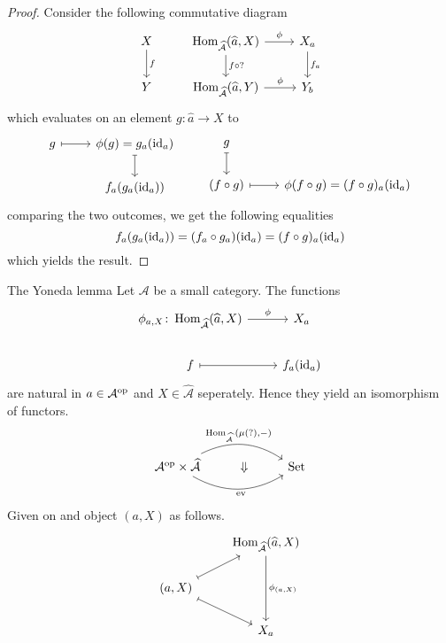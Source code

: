 \begin{proof}
    Consider the following commutative diagram 
    \[
    \begin{tikzcd}
        X
        \arrow[d,"f"]
        & 
        \Hom_{\widehat{\mathcal{A}}}(\widehat{a},X) 
        \arrow[r, "\phi"]
        \arrow[d, "f \circ ?"]
        &
        X_a
        \arrow[d,"f_a"]
        \\
        Y
        &
        \Hom_{\widehat{\mathcal{A}}}(\widehat{a}, Y) 
        \arrow[r, "\phi"]
        &
        Y_b
    \end{tikzcd}
    \]
    which evaluates on an element $g \colon \widehat{a} \to X$ to
    \[
    \begin{tikzcd}
        g
        \arrow[r,mapsto]
        &
        \phi(g) = g_a (\id_a)
        \arrow[d,mapsto]
        \\
        &
        f_a(g_a(\id_a))          
    \end{tikzcd}
    \qquad
    \begin{tikzcd}
        g
        \arrow[d,mapsto]
        &
        \\
        (f \circ g)
        \arrow[r, mapsto]
        & 
        \phi(f \circ g)=(f \circ g)_a(\id_a)
    \end{tikzcd}
    \]
    comparing the two outcomes, we get the following equalities
    \[
    f_a(g_a(\operatorname{id}_a))= (f_a \circ g_a)(\operatorname{id}_a) =(f \circ g)_a (\operatorname{id}_a)
    \]
    which yields the result.
\end{proof}

\begin{thm}{The Yoneda lemma}
    Let $\mathcal{A}$ be a small category. The functions 
    \[
    \begin{tikzcd}
        \phi_{a,X}\colon \Hom_{\widehat{\mathcal{A}}}(\widehat{a},X) 
        \arrow[r,"\phi"]
        &
        X_a
        \\
        f
        \arrow[r,mapsto]
        &
        f_a(\id_a)
    \end{tikzcd}
    \] 
    are natural in $a \in \mathcal{A}^{\operatorname{op}}$ and $X \in  \widehat{\mathcal{A}}$ seperately.
    Hence they yield an isomorphism of functors.
    \[
    \begin{tikzcd}
        \mathcal{A}^{\op} \times \widehat{\mathcal{A}}
        \arrow[rr, bend left , "\Hom_{\presh{A}}{(\mu(?),-)}" pos=0.45]
        \arrow[rr , bend right , "\ev"' pos=0.5325]
        &
        \Downarrow
        &
        \Set
    \end{tikzcd}
    \]
    Given on and object $(a,X)$ as follows.
    \[
    \begin{tikzcd}
        & 
        \Hom_{\presh{A}}(\widehat{a},X)
        \arrow[dd,"\phi_{(a,X)}"]
        \\
        (a,X)
        \arrow[rd, mapsto]
        \arrow[ru, mapsto]
        &
        \\
        &
        X_a
    \end{tikzcd}
    \]
\end{thm}

